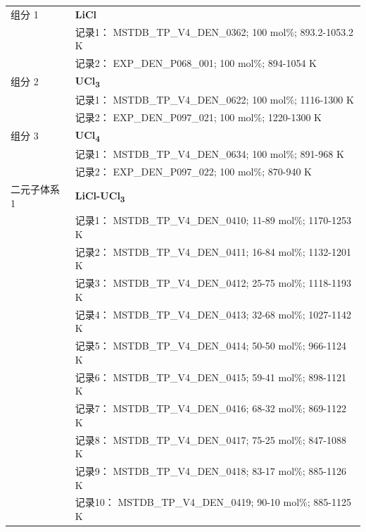 \documentclass[12pt]{article}
\begin{document}
{\begin{longtable}[]{@{}
  >{\raggedright\arraybackslash}p{}
  >{\raggedright\arraybackslash}p{}@{}}
组分 1  & \textbf{LiCl} \\
 & 记录1： MSTDB\_TP\_V4\_DEN\_0362; 100 mol\%; 893.2-1053.2 K \\
 & 记录2： EXP\_DEN\_P068\_001; 100 mol\%; 894-1054 K  \\

组分 2  & \textbf{UCl\textsubscript{3}} \\
 & 记录1： MSTDB\_TP\_V4\_DEN\_0622; 100 mol\%; 1116-1300 K \\
 & 记录2： EXP\_DEN\_P097\_021; 100 mol\%; 1220-1300 K  \\

组分 3  & \textbf{UCl\textsubscript{4}} \\
 & 记录1： MSTDB\_TP\_V4\_DEN\_0634; 100 mol\%; 891-968 K \\
 & 记录2： EXP\_DEN\_P097\_022; 100 mol\%; 870-940 K  \\

二元子体系 1  & \textbf{LiCl-UCl\textsubscript{3}} \\
 & 记录1： MSTDB\_TP\_V4\_DEN\_0410; 11-89 mol\%; 1170-1253 K \\
 & 记录2： MSTDB\_TP\_V4\_DEN\_0411; 16-84 mol\%; 1132-1201 K \\
 & 记录3： MSTDB\_TP\_V4\_DEN\_0412; 25-75 mol\%; 1118-1193 K \\
 & 记录4： MSTDB\_TP\_V4\_DEN\_0413; 32-68 mol\%; 1027-1142 K \\
 & 记录5： MSTDB\_TP\_V4\_DEN\_0414; 50-50 mol\%; 966-1124 K \\
 & 记录6： MSTDB\_TP\_V4\_DEN\_0415; 59-41 mol\%; 898-1121 K \\
 & 记录7： MSTDB\_TP\_V4\_DEN\_0416; 68-32 mol\%; 869-1122 K \\
 & 记录8： MSTDB\_TP\_V4\_DEN\_0417; 75-25 mol\%; 847-1088 K \\
 & 记录9： MSTDB\_TP\_V4\_DEN\_0418; 83-17 mol\%; 885-1126 K \\
 & 记录10： MSTDB\_TP\_V4\_DEN\_0419; 90-10 mol\%; 885-1125 K  \\


\end{longtable}}
\end{document}
